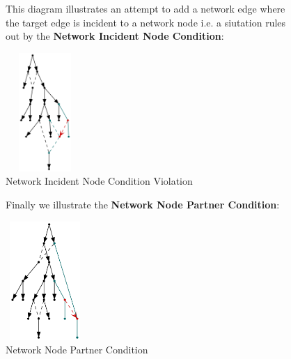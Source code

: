 \documentclass[11pt]{article}
\begin{document}
\begin{figure}
\noindent This diagram illustrates an attempt to add a network edge where the target edge is incident to a network node i.e. a siutation rules out by the \textbf{Network Incident Node Condition}:
\vspace{2mm}
  \begin{center}
  \includegraphics[width=30mm, height=45mm]{hasE2IncidentNetworkNode.png}
  \caption{Network Incident Node Condition Violation}
  \label{fig:hasE2IncidentNetworkNode}
  \end{center}
\end{figure}


\begin{figure}
\noindent Finally we illustrate the \textbf{Network Node Partner Condition}:
\vspace{2mm}
  \begin{center}
  \includegraphics[width=30mm, height=45mm]{e2NetworkEdgeComplementNodeAncestralToE1.png}
  \caption{Network Node Partner Condition}
  \label{fig:e2NetworkEdgeComplementNodeAncestralToE1}
  \end{center}
\end{figure}
\end{document}
